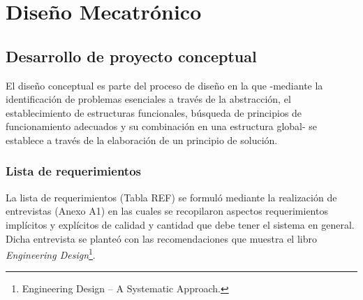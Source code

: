 
\doublespacing
\chapter{Diseño Mecatrónico}

\section{Desarrollo de proyecto conceptual}

El diseño conceptual es parte del proceso de diseño en la que -mediante la identificación de problemas esenciales a través de la abstracción, el establecimiento de estructuras funcionales, búsqueda de principios de funcionamiento adecuados y su combinación en una estructura global- se establece a través de la elaboración de un principio de solución.\cite[p.~159]{Pahl2007}

\subsection{Lista de requerimientos}

La lista de requerimientos (Tabla REF) se formuló mediante la realización de entrevistas (Anexo  A1) en las cuales se recopilaron aspectos requerimientos implícitos y explícitos de calidad y cantidad que debe tener el sistema en general. Dicha entrevista se planteó con las recomendaciones que muestra el libro \textit{Engineering Design}\footnote{Engineering Design – A Systematic Approach.\cite[p.~144-158]{Pahl2007}}.

